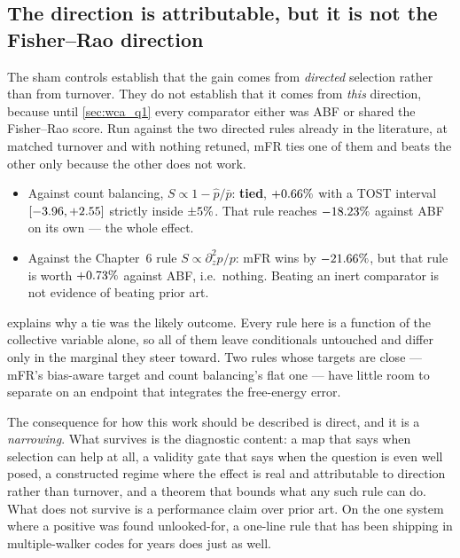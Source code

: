 \subsection{The direction is attributable, but it is not the Fisher--Rao direction}
\label{sec:q1_synthesis}
The sham controls establish that the gain comes from \emph{directed} selection rather than
from turnover. They do not establish that it comes from \emph{this} direction, because until
\cref{sec:wca_q1} every comparator either was ABF or shared the Fisher--Rao score. Run against
the two directed rules already in the literature, at matched turnover and with nothing
retuned, mFR ties one of them and beats the other only because the other does not work.

\begin{itemize}
  \item Against count balancing, $S\propto 1-\hat p/\bar p$: \textbf{tied}, $+0.66\%$
  with a TOST interval $[-3.96, +2.55]$ strictly inside
  $\pm5\%$. That rule reaches $-18.23\%$ against ABF on its own
  --- the whole effect.
  \item Against the Chapter~6 rule $S\propto\partial_z^2 p/p$: mFR wins by $-21.66\%$,
  but that rule is worth $+0.73\%$ against ABF, i.e.\ nothing. Beating an inert
  comparator is not evidence of beating prior art.
\end{itemize}

 explains why a tie was the likely outcome. Every rule here is a
function of the collective variable alone, so all of them leave conditionals untouched and
differ only in the marginal they steer toward. Two rules whose targets are close --- mFR's
bias-aware target and count balancing's flat one --- have little room to separate on an
endpoint that integrates the free-energy error.

The consequence for how this work should be described is direct, and it is a
\emph{narrowing}. What survives is the diagnostic content: a map that says when selection can
help at all, a validity gate that says when the question is even well posed, a constructed
regime where the effect is real and attributable to direction rather than turnover, and a
theorem that bounds what any such rule can do. What does not survive is a performance claim
over prior art. On the one system where a positive was found unlooked-for, a one-line rule
that has been shipping in multiple-walker codes for years does just as well.

